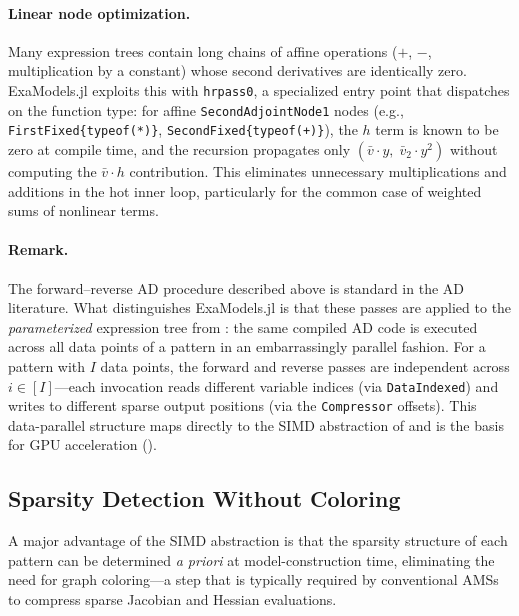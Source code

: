 \documentclass[11pt]{article}
\begin{document}
\paragraph{Linear node optimization.}
Many expression trees contain long chains of affine operations ($+$, $-$, multiplication by a constant) whose second derivatives are identically zero. ExaModels.jl exploits this with \texttt{hrpass0}, a specialized entry point that dispatches on the function type: for affine \texttt{SecondAdjointNode1} nodes (e.g., \texttt{FirstFixed\{typeof(*)\}}, \texttt{SecondFixed\{typeof(+)\}}), the $h$ term is known to be zero at compile time, and the recursion propagates only $(\bar{v} \cdot y,\; \bar{v}_2 \cdot y^2)$ without computing the $\bar{v} \cdot h$ contribution. This eliminates unnecessary multiplications and additions in the hot inner loop, particularly for the common case of weighted sums of nonlinear terms.

\paragraph{Remark.}
The forward--reverse AD procedure described above is standard in the AD literature. What distinguishes ExaModels.jl is that these passes are applied to the \emph{parameterized} expression tree from : the same compiled AD code is executed across all data points of a pattern in an embarrassingly parallel fashion. For a pattern with $I$ data points, the forward and reverse passes are independent across $i \in [I]$---each invocation reads different variable indices (via \texttt{DataIndexed}) and writes to different sparse output positions (via the \texttt{Compressor} offsets). This data-parallel structure maps directly to the SIMD abstraction of  and is the basis for GPU acceleration ().

\subsection{Sparsity Detection Without Coloring}
\label{sec:ad:sparsity}

A major advantage of the SIMD abstraction is that the sparsity structure of each pattern can be determined \emph{a priori} at model-construction time, eliminating the need for graph coloring---a step that is typically required by conventional AMSs to compress sparse Jacobian and Hessian evaluations.
\end{document}
